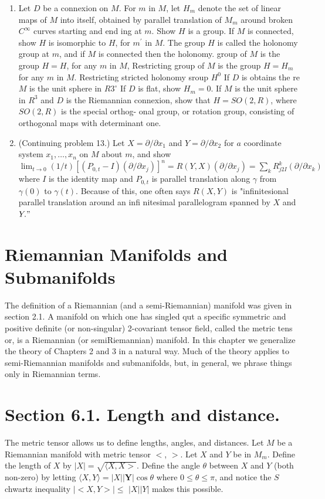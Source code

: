 \documentclass[10pt]{article}
\begin{document}
\begin{enumerate}
  \item Let $D$ be a connexion on $M$. For $m$ in $M$, let $H_{m}$ denote the set of linear maps of $M$ into itself, obtained by parallel translation of $M_{m}$ around broken $C^{\infty}$ curves starting and end ing at $m .$ Show $H$ is a group. If $M$ is connected, show $H$ is isomorphic to $H$, for $m^{\prime}$ in $M$. The group $H$ is called the holonomy group at $m$, and if $M$ is connected then the holonomy. group of $M$ is the group $H=H$, for any $m$ in $M$, Restricting group of $M$ is the group $H=H_{m}$ for any $m$ in $M .$ Restricting stricted holonomy sroup $H^{0}$ If $D$ is obtains the re$M$ is the unit sphere in $R 3^{\circ}$ If $D$ is flat, show $H_{m}=0 .$ If $M$ is the unit sphere in $R^{3}$ and $D$ is the Riemannian connexion, show that $H=S O(2, R)$, where $S O(2, R)$ is the special orthog- onal group, or rotation group, consisting of orthogonal maps with determinant one.

  \item (Continuing problem 13.) Let $X=\partial / \partial x_{1}$ and $Y=\partial / \partial x_{2}$ for $a$ coordinate system $x_{1}, \ldots, x_{n}$ on $M$ about $m$, and show $\lim _{t \rightarrow 0}(1 / t)\left[\left(P_{0, t}-I\right)\left(\partial / \partial x_{j}\right)\right]^{n}=R(Y, X)\left(\partial / \partial x_{j}\right)=\sum_{k} R_{j 2 I}^{k}\left(\partial / \partial x_{k}\right)$ where $I$ is the identity map and $P_{0, t}$ is parallel translation along $\gamma$ from $\gamma(0)$ to $\gamma(t)$. Because of this, one often says $R(X, Y)$ is "infinitesional parallel translation around an infi nitesimal parallelogram spanned by $X$ and $Y . "$

\end{enumerate}
\section{Riemannian Manifolds and Submanifolds}
The definition of a Riemannian (and a semi-Riemannian) manifold was given in section 2.1. A manifold on which one has singled qut a specific symmetric and positive definite (or non-singular) 2-covariant tensor field, called the metric tens or, is a Riemannian (or semiRiemannian) manifold. In this chapter we generalize the theory of Chapters 2 and 3 in a natural way. Much of the theory applies to semi-Riemannian manifolds and submanifolds, but, in general, we phrase things only in Riemannian terms.

\section{Section 6.1. Length and distance.}
The metric tensor allows us to define lengths, angles, and distances. Let $M$ be a Riemannian manifold with metric tensor $<$, $>$. Let $X$ and $Y$ be in $M_{m}$. Define the length of $X$ by $|X|=\sqrt{\langle X, X>}$. Define the angle $\theta$ between $X$ and $Y$ (both non-zero) by letting $\langle X, Y\rangle=|X||\boldsymbol{Y}| \cos \theta$ where $0 \leq \theta \leq \pi$, and notice the $S$ chwartz inequality $|<X, Y>| \leq$ $|X||Y|$ makes this possible.
\end{document}
